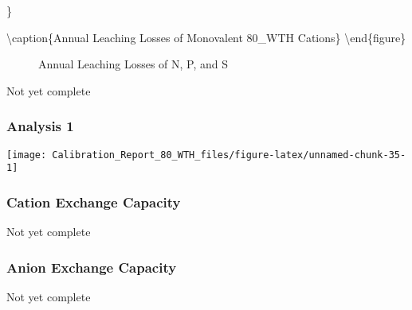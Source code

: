 \documentclass[
]{article}
\begin{document}
\}

\textbackslash caption\{Annual Leaching Losses of Monovalent 80\_WTH
Cations\}\label{fig:unnamed-chunk-32} \textbackslash end\{figure\}

\begin{figure}[H]

{\centering {}\newline{}

}

\caption{Annual Leaching Losses of N, P, and S}\label{fig:unnamed-chunk-33}
\end{figure}

Not yet complete

\hypertarget{analysis-1}{%
\subsubsection{Analysis 1}\label{analysis-1}}

\begin{center}\texttt{[image: Calibration\_Report\_80\_WTH\_files/figure-latex/unnamed-chunk-35-1]} \end{center}

\hypertarget{cation-exchange-capacity}{%
\subsubsection{Cation Exchange
Capacity}\label{cation-exchange-capacity}}

Not yet complete

\hypertarget{anion-exchange-capacity}{%
\subsubsection{Anion Exchange Capacity}\label{anion-exchange-capacity}}

Not yet complete
\end{document}
